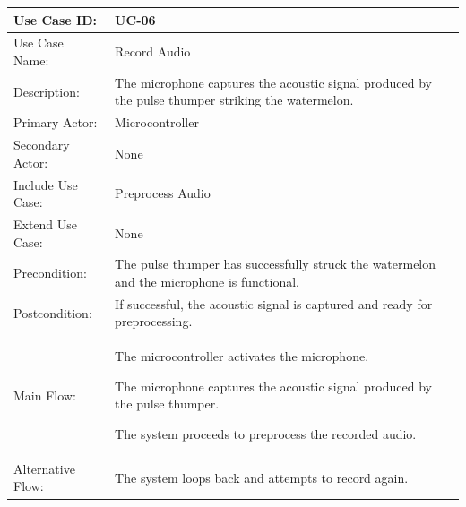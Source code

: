 \begin{thesisprose}
\FloatBarrier
\begingroup
\small
\setlength{\tabcolsep}{3pt}
\renewcommand{\arraystretch}{1.14}
\setlength{\arrayrulewidth}{0.625pt}
\def\LTcaptype{uncaptionedgrid}
\begin{longtable}{|>{\raggedright\arraybackslash}p{}|>{\raggedright\arraybackslash}p{}|}
\hline
Use Case ID: & UC-06 \\
\hline
Use Case Name: & Record Audio \\
\hline
Description: & The microphone captures the acoustic signal produced by the pulse thumper striking the watermelon. \\
\hline
Primary Actor: & Microcontroller \\
\hline
Secondary Actor: & None \\
\hline
Include Use Case: & Preprocess Audio \\
\hline
Extend Use Case: & None \\
\hline
Precondition: & The pulse thumper has successfully struck the watermelon and the microphone is functional. \\
\hline
Postcondition: & If successful, the acoustic signal is captured and ready for preprocessing. \\
\hline
Main Flow: & The microcontroller activates the microphone.\par The microphone captures the acoustic signal produced by the pulse thumper.\par The system proceeds to preprocess the recorded audio. \\
\hline
Alternative Flow: & The system loops back and attempts to record again. \\
\hline
\end{longtable}
\endgroup


\end{thesisprose}
